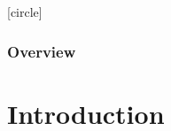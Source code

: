 \documentclass[10pt, aspectratio=169]{beamer}
\theoremstyle{remark}
\theoremstyle{definition}
\begin{document}
[circle]

\begin{frame}
	\frametitle{Overview} %
	\tableofcontents %
\end{frame}



\section{Introduction}
\end{document}
